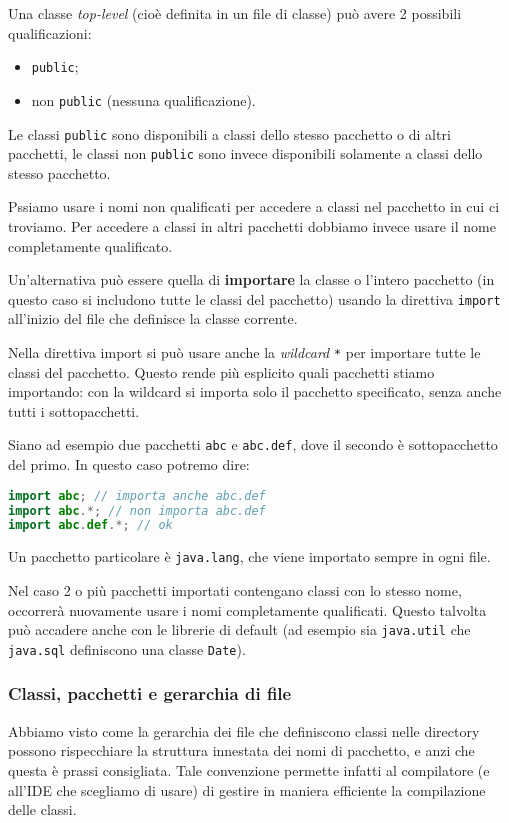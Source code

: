 \documentclass[a4paper,11pt]{article}
\begin{document}
Una classe \textit{top-level} (cioè definita in un file di classe) può avere 2 possibili qualificazioni:
\begin{itemize}
	\item \lstinline|public|;
	\item non \lstinline|public| (nessuna qualificazione).
\end{itemize}

Le classi \lstinline|public| sono disponibili a classi dello stesso pacchetto o di altri pacchetti, le classi non \lstinline|public| sono invece disponibili solamente a classi dello stesso pacchetto.

Pssiamo usare i nomi non qualificati per accedere a classi nel pacchetto in cui ci troviamo.
Per accedere a classi in altri pacchetti dobbiamo invece usare il nome completamente qualificato.

Un'alternativa può essere quella di \textbf{importare} la classe o l'intero pacchetto (in questo caso si includono tutte le classi del pacchetto) usando la direttiva \lstinline|import| all'inizio del file che definisce la classe corrente.

Nella direttiva import si può usare anche la \textit{wildcard} \lstinline|*| per importare tutte le classi del pacchetto.
Questo rende più esplicito quali pacchetti stiamo importando: con la wildcard si importa solo il pacchetto specificato, senza anche tutti i sottopacchetti.

Siano ad esempio due pacchetti \lstinline|abc| e \lstinline|abc.def|, dove il secondo è sottopacchetto del primo.
In questo caso potremo dire:
\begin{lstlisting}[language=java, style=codestyle]	
import abc; // importa anche abc.def
import abc.*; // non importa abc.def
import abc.def.*; // ok
\end{lstlisting}

Un pacchetto particolare è \lstinline|java.lang|, che viene importato sempre in ogni file.

Nel caso 2 o più pacchetti importati contengano classi con lo stesso nome, occorrerà nuovamente usare i nomi completamente qualificati.
Questo talvolta può accadere anche con le librerie di default (ad esempio sia \lstinline|java.util| che \lstinline|java.sql| definiscono una classe \lstinline|Date|).

\subsubsection{Classi, pacchetti e gerarchia di file}
Abbiamo visto come la gerarchia dei file che definiscono classi nelle directory possono rispecchiare la struttura innestata dei nomi di pacchetto, e anzi che questa è prassi consigliata.
Tale convenzione permette infatti al compilatore (e all'IDE che scegliamo di usare) di gestire in maniera efficiente la compilazione delle classi.
\end{document}

